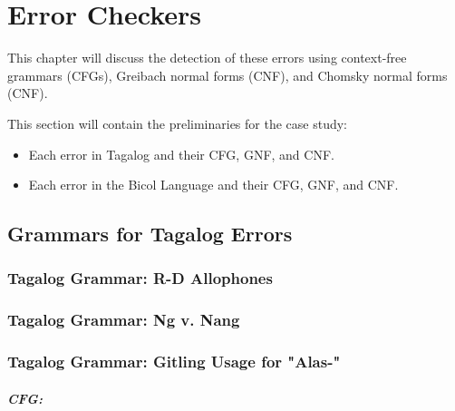 \chapter{Error Checkers}
This chapter will discuss the detection of these errors using context-free grammars (CFGs), Greibach normal forms (CNF), and Chomsky normal forms (CNF).

{\color{blue}
This section will contain the preliminaries for the case study:

\begin{itemize}
    \item Each error in Tagalog and their CFG, GNF, and CNF.
    \item Each error in the Bicol Language and their CFG, GNF, and CNF.
\end{itemize}
}

\section{Grammars for Tagalog Errors}
\subsection{Tagalog Grammar: R-D Allophones}
\subsection{Tagalog Grammar: Ng v. Nang}
\subsection{Tagalog Grammar: Gitling Usage for "Alas-"}
\paragraph{CFG:}

